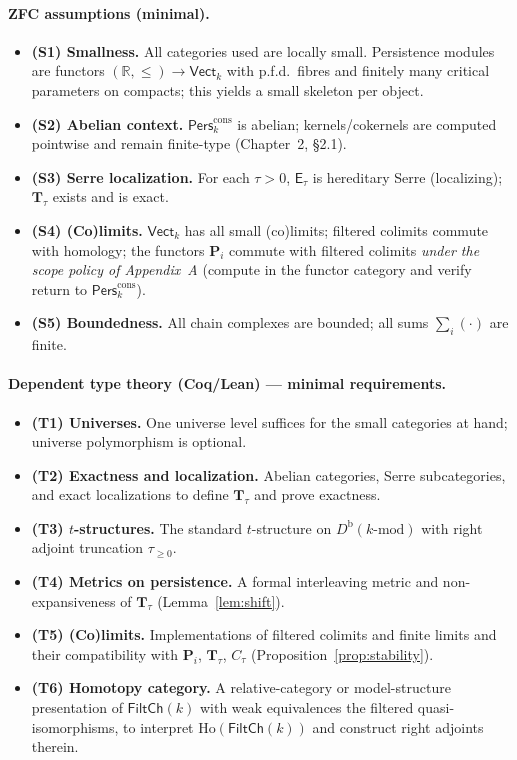 \documentclass[11pt]{article}
\DeclareRobustCommand{\hyp}{\nobreakdash-}
\numberwithin{equation}{section}
\theoremstyle{definition}
\begin{document}
\paragraph{ZFC assumptions (minimal).}
\begin{itemize}
  \item \textbf{(S1) Smallness.} All categories used are locally small. Persistence modules are functors $(\mathbb{R},\le)\to \mathsf{Vect}_k$ with p.f.d.\ fibres and finitely many critical parameters on compacts; this yields a small skeleton per object.
  \item \textbf{(S2) Abelian context.} $\mathsf{Pers}^{\mathrm{cons}}_k$ is abelian; kernels/cokernels are computed pointwise and remain finite\hyp type (Chapter~2, §2.1).
  \item \textbf{(S3) Serre localization.} For each $\tau>0$, $\mathsf{E}_\tau$ is hereditary Serre (localizing); $\mathbf{T}_\tau$ exists and is exact.
  \item \textbf{(S4) (Co)limits.} $\mathsf{Vect}_k$ has all small (co)limits; filtered colimits commute with homology; the functors $\mathbf{P}_i$ commute with filtered colimits \emph{under the scope policy of Appendix~A} (compute in the functor category and verify return to $\mathsf{Pers}^{\mathrm{cons}}_k$).
  \item \textbf{(S5) Boundedness.} All chain complexes are bounded; all sums $\sum_i(\cdot)$ are finite.
\end{itemize}

\paragraph{Dependent type theory (Coq/Lean) — minimal requirements.}
\begin{itemize}
  \item \textbf{(T1) Universes.} One universe level suffices for the small categories at hand; universe polymorphism is optional.
  \item \textbf{(T2) Exactness and localization.} Abelian categories, Serre subcategories, and exact localizations to define $\mathbf{T}_\tau$ and prove exactness.
  \item \textbf{(T3) $t$-structures.} The standard $t$-structure on $D^{\mathrm{b}}(k\text{-mod})$ with right adjoint truncation $\tau_{\ge 0}$.
  \item \textbf{(T4) Metrics on persistence.} A formal interleaving metric and non\hyp expansiveness of $\mathbf{T}_\tau$ (Lemma~\ref{lem:shift}).
  \item \textbf{(T5) (Co)limits.} Implementations of filtered colimits and finite limits and their compatibility with $\mathbf{P}_i$, $\mathbf{T}_\tau$, $C_\tau$ (Proposition~\ref{prop:stability}).
  \item \textbf{(T6) Homotopy category.} A relative\hyp category or model\hyp structure presentation of $\mathsf{FiltCh}(k)$ with weak equivalences the filtered quasi\hyp isomorphisms, to interpret $\mathrm{Ho}(\mathsf{FiltCh}(k))$ and construct right adjoints therein.
\end{itemize}
\end{document}
